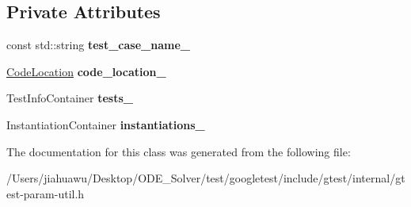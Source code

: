 \subsection*{Private Attributes}
\begin{DoxyCompactItemize}
\item 
\mbox{\label{classtesting_1_1internal_1_1_parameterized_test_case_info_a29b78b287552ba36a896e9352e86440c}} 
const std\+::string {\bfseries test\+\_\+case\+\_\+name\+\_\+}
\item 
\mbox{\label{classtesting_1_1internal_1_1_parameterized_test_case_info_a7eb114d9580001f9cb978684dfa8e0ee}} 
\mbox{\hyperlink{structtesting_1_1internal_1_1_code_location}{Code\+Location}} {\bfseries code\+\_\+location\+\_\+}
\item 
\mbox{\label{classtesting_1_1internal_1_1_parameterized_test_case_info_a561fad516239cf6427df6915ba3182e9}} 
Test\+Info\+Container {\bfseries tests\+\_\+}
\item 
\mbox{\label{classtesting_1_1internal_1_1_parameterized_test_case_info_a2e86fd404a78daa1f1169bf689c4b3f4}} 
Instantiation\+Container {\bfseries instantiations\+\_\+}
\end{DoxyCompactItemize}


The documentation for this class was generated from the following file\+:\begin{DoxyCompactItemize}
\item 
/\+Users/jiahuawu/\+Desktop/\+O\+D\+E\+\_\+\+Solver/test/googletest/include/gtest/internal/gtest-\/param-\/util.\+h\end{DoxyCompactItemize}
